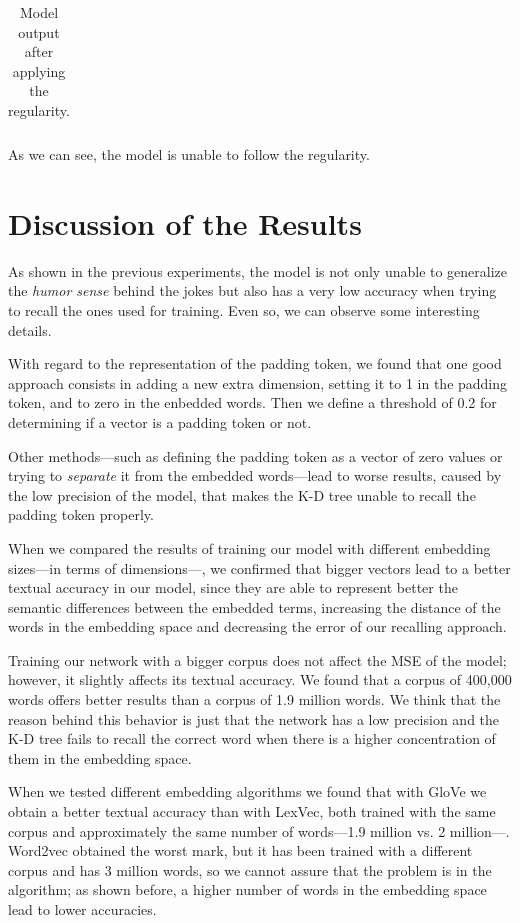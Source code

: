 \documentclass[]{article}
\begin{document}
\begin{table}[H]
\begin{tabular}{@{}ccc@{}}
		\end{tabular}
		\caption{Model output after applying the regularity.}
		\label{t:reg6}
	\end{table}
	
	As we can see, the model is unable to follow the regularity.
	
	\section{Discussion of the Results}
	
	As shown in the previous experiments, the model is not only unable to generalize the \emph{humor sense} behind the jokes but also has a very low accuracy when trying to recall the ones used for training. Even so, we can observe some interesting details.
	
	With regard to the representation of the padding token, we found that one good approach consists in adding a new extra dimension, setting it to 1 in the padding token, and to zero in the enbedded words. Then we define a threshold of 0.2 for determining if a vector is a padding token or not.
	
	Other methods---such as defining the padding token as a vector of zero values or trying to \emph{separate} it from the embedded words---lead to worse results, caused by the low precision of the model, that makes the K-D tree unable to recall the padding token properly.
	
	When we compared the results of training our model with different embedding sizes---in terms of dimensions---, we confirmed that bigger vectors lead to a better textual accuracy in our model, since they are able to represent better the semantic differences between the embedded terms, increasing the distance of the words in the embedding space and decreasing the error of our recalling approach.
	
	Training our network with a bigger corpus does not affect the MSE of the model; however, it slightly affects its textual accuracy. We found that a corpus of 400,000 words offers better results than a corpus of 1.9 million words. We think that the reason behind this behavior is just that the network has a low precision and the K-D tree fails to recall the correct word when there is a higher concentration of them in the embedding space.
	
	When we tested different embedding algorithms we found that with GloVe we obtain a better textual accuracy than with LexVec, both trained with the same corpus and approximately the same number of words---1.9 million vs. 2 million---. Word2vec obtained the worst mark, but it has been trained with a different corpus and has 3 million words, so we cannot assure that the problem is in the algorithm; as shown before, a higher number of words in the embedding space lead to lower accuracies.
	
\end{document}
